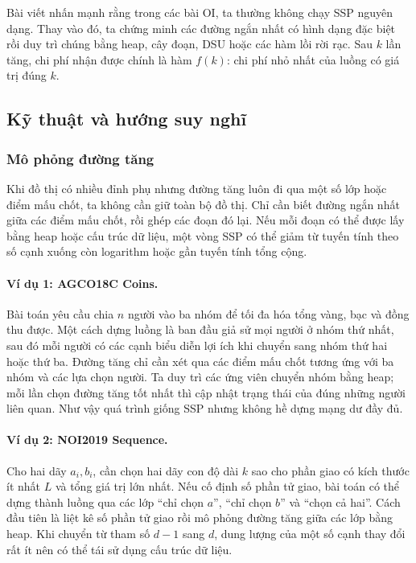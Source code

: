 \documentclass[11pt]{article}
\begin{document}
Bài viết nhấn mạnh rằng trong các bài OI, ta thường không chạy SSP nguyên dạng.
Thay vào đó, ta chứng minh các đường ngắn nhất có hình dạng đặc biệt rồi duy trì
chúng bằng heap, cây đoạn, DSU hoặc các hàm lồi rời rạc. Sau $k$ lần tăng, chi
phí nhận được chính là hàm $f(k)$: chi phí nhỏ nhất của luồng có giá trị đúng
$k$.

\subsection{Kỹ thuật và hướng suy nghĩ}

\subsubsection{Mô phỏng đường tăng}

Khi đồ thị có nhiều đỉnh phụ nhưng đường tăng luôn đi qua một số lớp hoặc điểm
mấu chốt, ta không cần giữ toàn bộ đồ thị. Chỉ cần biết đường ngắn nhất giữa
các điểm mấu chốt, rồi ghép các đoạn đó lại. Nếu mỗi đoạn có thể được lấy bằng
heap hoặc cấu trúc dữ liệu, một vòng SSP có thể giảm từ tuyến tính theo số cạnh
xuống còn logarithm hoặc gần tuyến tính tổng cộng.

\paragraph{Ví dụ 1: AGCO18C Coins.}
Bài toán yêu cầu chia $n$ người vào ba nhóm để tối đa hóa tổng vàng, bạc và
đồng thu được. Một cách dựng luồng là ban đầu giả sử mọi người ở nhóm thứ nhất,
sau đó mỗi người có các cạnh biểu diễn lợi ích khi chuyển sang nhóm thứ hai
hoặc thứ ba. Đường tăng chỉ cần xét qua các điểm mấu chốt tương ứng với ba nhóm
và các lựa chọn người. Ta duy trì các ứng viên chuyển nhóm bằng heap; mỗi lần
chọn đường tăng tốt nhất thì cập nhật trạng thái của đúng những người liên quan.
Như vậy quá trình giống SSP nhưng không hề dựng mạng dư đầy đủ.

\paragraph{Ví dụ 2: NOI2019 Sequence.}
Cho hai dãy $a_i,b_i$, cần chọn hai dãy con độ dài $k$ sao cho phần giao có kích
thước ít nhất $L$ và tổng giá trị lớn nhất. Nếu cố định số phần tử giao, bài
toán có thể dựng thành luồng qua các lớp ``chỉ chọn $a$'', ``chỉ chọn $b$'' và
``chọn cả hai''. Cách đầu tiên là liệt kê số phần tử giao rồi mô phỏng đường
tăng giữa các lớp bằng heap. Khi chuyển từ tham số $d-1$ sang $d$, dung lượng
của một số cạnh thay đổi rất ít nên có thể tái sử dụng cấu trúc dữ liệu.
\end{document}
